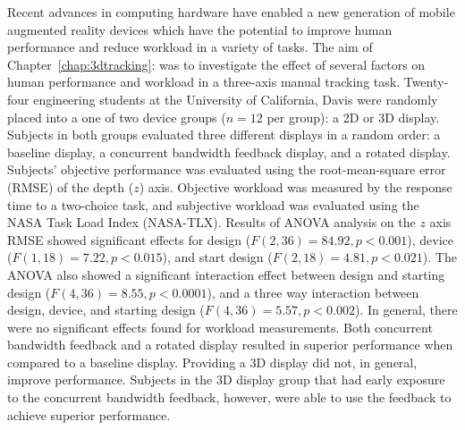 Recent advances in computing hardware have enabled a new generation of mobile augmented reality devices which have the potential to improve human performance and reduce workload in a variety of tasks.
The aim of Chapter~\ref{chap:3dtracking}:  was to investigate the effect of several factors on human performance and workload in a three-axis manual tracking task.
Twenty-four engineering students at the University of California, Davis were randomly placed into a one of two device groups ($n=12$ per group): a 2D or 3D display.
Subjects in both groups evaluated three different displays in a random order: a baseline display, a concurrent bandwidth feedback display, and a rotated display.
Subjects' objective performance was evaluated using the root-mean-square error (RMSE) of the depth ($z$) axis.
Objective workload was measured by the response time to a two-choice task, and subjective workload was evaluated using the NASA Task Load Index (NASA-TLX).
Results of ANOVA analysis on the $z$ axis RMSE showed significant effects for design ($F(2, 36)=84.92, p<0.001$), device ($F(1, 18)=7.22, p<0.015$), and start design ($F(2, 18)=4.81, p<0.021$).
The ANOVA also showed a significant interaction effect between design and starting design ($F(4, 36)=8.55, p<0.0001$), and a three way interaction between design, device, and starting design ($F(4, 36)=5.57, p<0.002$).
In general, there were no significant effects found for workload measurements.
Both concurrent bandwidth feedback and a rotated display resulted in superior performance when compared to a baseline display.
Providing a 3D display did not, in general, improve performance.
Subjects in the 3D display group that had early exposure to the concurrent bandwidth feedback, however, were able to use the feedback to achieve superior performance.

